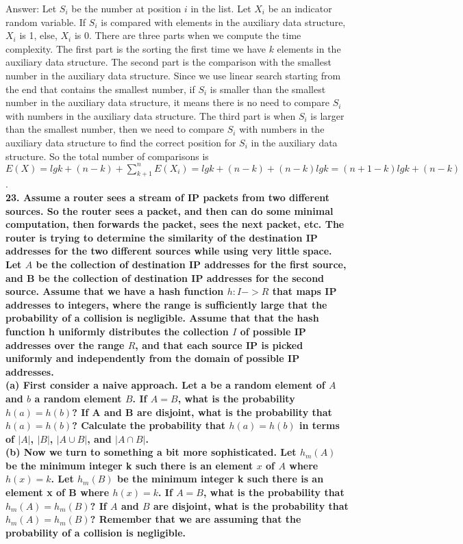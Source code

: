 \documentclass{article}
\begin{document}
Answer: Let $S_i$ be the number at position $i$ in the list. Let $X_i$ be an indicator random variable. If $S_i$ is compared with elements in the auxiliary data structure, $X_i$ is 1, else, $X_i$ is 0. There are three parts when we compute the time complexity. The first part is the sorting the first time we have $k$ elements in the auxiliary data structure. The second part is the comparison with the smallest number in the auxiliary data structure. Since we use linear search starting from the end that contains the smallest number, if $S_i$ is smaller than the smallest number in the auxiliary data structure, it means there is no need to compare $S_i$ with numbers in the auxiliary data structure. The third part is when $S_i$ is larger than the smallest number, then we need to compare $S_i$ with numbers in the auxiliary data structure to find the correct position for $S_i$ in the auxiliary data structure. So the total number of comparisons is $E(X) = lgk + (n - k) + \sum_{k+1}^{n}E(X_i) = lgk + (n - k) + (n - k)lgk = (n + 1 - k)lgk + (n - k)$.\\ \newline
\textbf{23. Assume a router sees a stream of IP packets from two different sources. So the router sees a packet, and then can do some minimal computation, then forwards the packet, sees the next packet, etc. The router is trying to determine the similarity of the destination IP addresses for the two different sources while using very little space. Let $A$ be the collection of destination IP addresses for the first source, and B be the collection of destination IP addresses for the second source. Assume that we have a hash function $h: I -> R$ that maps IP addresses to integers, where the range is sufficiently large that the probability of a collision is negligible. Assume that that the hash function h uniformly distributes the collection $I$ of possible IP addresses over the range $R$, and that each source IP is picked uniformly and independently from the domain of possible IP addresses.} \\ \newline
\textbf{(a) First consider a naive approach. Let a be a random element of $A$ and $b$ a random element $B$. If $A = B$, what is the probability $h(a) = h(b)$? If A and B are disjoint, what is the probability that $h(a) = h(b)$? Calculate the probability that $h(a) = h(b)$ in terms of $|A|$, $|B|$, $|A\cup B|$, and $|A\cap B|$.} \\ \newline
\textbf{(b) Now we turn to something a bit more sophisticated. Let $h_m(A)$ be the minimum integer k such there is an element $x$ of $A$ where $h(x) = k$. Let $h_m(B)$ be the minimum integer k such there is an element x of B where $h(x) = k$. If $A = B$, what is the probability that $h_m(A) = h_m(B)$? If $A$ and $B$ are disjoint, what is the probability that $h_m(A) = h_m(B)$? Remember that we are assuming that the probability of a collision is negligible.}\\ \newline
\end{document}
